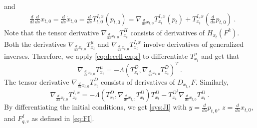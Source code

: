 \documentclass[final]{svjour3}
\newcommand{\df}[2]{\tfrac{d}{d#2} #1}
\newcommand{\sdf}[2]{\scriptscriptstyle\frac{d}{d#2} #1}
\begin{document}
    and
    \begin{align*}
        &\df{\df{x_{t,0}}{s}}{t} 
        = \df{\dot{x}_{t,0}}{s}
        = 
        \df{T_{t,0}^{I,x}}{s}(p_{t,0})
        =
        \nabla_{\sdf{x_{t,0}}{s}}T_{x_t}^{I,x}(p_{t})
        +
        T_{x_{t}}^{I,x}(\df{p_{t,0}}{s})
    \ .
    \end{align*}
    Note that the tensor derivative $\nabla_{\sdf{x_{t,0}}{s}}T_{x_t}^H$
    consists of derivatives of $H_{x_t}(F^k)$. Both the derivatives
    $\nabla_{\sdf{x_{t,0}}{s}}T_{x_t}^\mu$ and 
    $\nabla_{\sdf{x_{t,0}}{s}}T_{x_t}^{I,x}$ involve derivatives of generalized
    inverses. Therefore, we apply \eqref{eq:decell-expr} to differentiate $T_{x_t}^\mu$
    and get that
    \begin{equation*}
        \nabla_{\sdf{x_{t,0}}{s}}T_{x_t}^\mu
        =
        -\Lambda(T_{x_{t}}^D,\nabla_{\sdf{x_{t,0}}{s}}T_{x_t}^D)^T
        \ .
    \end{equation*}
    The tensor derivative $\nabla_{\sdf{x_{t,0}}{s}}T_{x_t}^D$ consists of derivatives of $D_{x_{t,s}}F$.
    Similarly,
    \begin{equation*}
        \nabla_{\sdf{x_{t,0}}{s}}T_{x_t}^{I,x}
        =
        -\Lambda(T_{x_{t}}^D,\nabla_{\sdf{x_{t,0}}{s}}T_{x_t}^D)T_{x_{t}}^D
        -T_{x_{t}}^{D^\dagger}\nabla_{\sdf{x_{t,0}}{s}}T_{x_t}^D
        \ .
    \end{equation*}
    By differentiating the initial conditions, we get
    \eqref{sys:JI} with $y=\df{p_{t,0}}{s}$, $z=\df{x_{t,0}}{s}$, and
    $F_{q,v}^I$ as defined in \eqref{eq:FI}.
\end{document}
